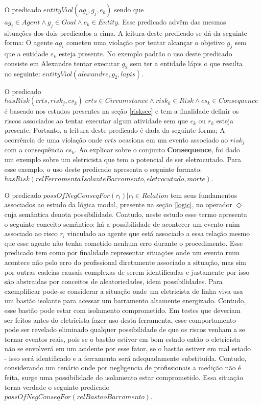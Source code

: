 O predicado $ entityViol(ag_i,g_j,e_k) $ sendo que $ag_i \in Agent \wedge g_j \in Goal \wedge e_k \in Entity$. Esse predicado advêm das mesmas situações dos dois predicados a cima. A leitura deste predicado se dá da seguinte forma: O agente $ag_i$ cometeu uma violação por tentar alcançar o objetivo $g_j$ sem que a entidade $e_k$ esteja presente. No exemplo padrão o uso deste predicado consiste em Alexandre tentar executar $g_2$ sem ter a entidade lápis o que resulta no seguinte: $entityViol(alexandre, g_2, lapis)$.

O predicado $ hasRisk(crts, risk_j, cs_k) | crts \in Circumstance \wedge  risk_k \in Risk \wedge cs_k \in Consequence $ é baseado nos estudos presentes na seção \ref{risksec} e tem a finalidade definir os riscos associados ao tentar executar algum atividade sem que $c_k$ ou $r_k$ esteja presente. Portanto, a leitura deste predicado é dada da seguinte forma; A ocorrência de uma violação onde $crts$ ocasiona em um evento associado ao $risk_j$ com a consequência $cs_k$. Ao explicar sobre o conjunto \textbf{Consequence}, foi dado um exemplo sobre um eletricista que tem o potencial de ser eletrocutado. Para esse exemplo, o uso deste predicado apresenta o seguinte formato: $hasRisk(relFerramentaIsolanteBarramento, eletrocutado, morte)$.

O predicado $possOfNegConseqFor(r_l) | r_l \in Relation $ tem seus fundamentos associados ao estudo da lógica modal, presente na seção \ref{logic}, no operador $\Diamond$ cuja semântica denota possibilidade. Contudo, neste estudo esse termo apresenta o seguinte conceito semântico: há a possibilidade de acontecer um evento ruim associado ao risco $r_l$ vinculado ao agente que está associado a essa relação mesmo que esse agente não tenha cometido nenhum erro durante o procedimento. Esse predicado tem como por finalidade representar situações onde um evento ruim acontece não pelo erro do profissional diretamente associado a situação, mas sim por outras cadeias causais complexas de serem identificadas e justamente por isso são abstraidas por conceitos de aleatoriedades, idem possibilidades. Para exemplificar pode-se considerar a situação onde um eletricista de linha viva usa um bastão isolante para acessar um barramento altamente energizado. Contudo, esse bastão pode estar com isolamento comprometido. Em testes que deveriam ser feitos antes do eletricista fazer uso desta ferramenta, esse comportamento pode ser revelado eliminado qualquer possibilidade de que os riscos venham a se tornar eventos reais, pois se o bastão estiver em bom estado então o eletricista não se envolverá em um acidente por esse fator, se o bastão estiver em mal estado - isso será identificado e a ferramenta será adequadamente substituída. Contudo, considerando um cenário onde por negligencia de profissionais a medição não é feita, surge uma possibilidade do isolamento estar comprometido. Essa situação torna verdade o seguinte predicado $possOfNegConseqFor(relBastaoBarramento)$.

